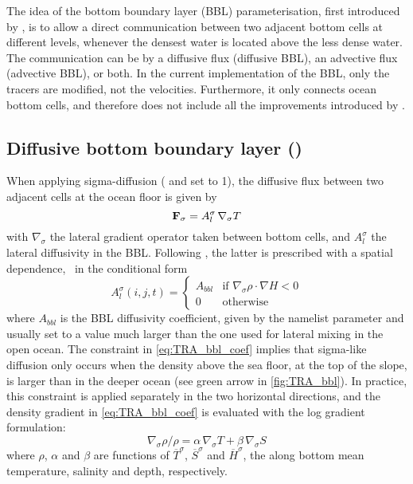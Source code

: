 \documentclass[../main/NEMO_manual]{subfiles}
\begin{document}
The idea of the bottom boundary layer (BBL) parameterisation, first introduced by
\citet{beckmann.doscher_JPO97},
is to allow a direct communication between two adjacent bottom cells at different levels,
whenever the densest water is located above the less dense water.
The communication can be by a diffusive flux (diffusive BBL),
an advective flux (advective BBL), or both.
In the current implementation of the BBL, only the tracers are modified, not the velocities.
Furthermore, it only connects ocean bottom cells,
and therefore does not include all the improvements introduced by \citet{campin.goosse_T99}.

\subsection[Diffusive bottom boundary layer (\forcode{nn_bbl_ldf=1})]{Diffusive bottom boundary layer (\protect{})}
\label{subsec:TRA_bbl_diff}

When applying sigma-diffusion
( and  set to 1),
the diffusive flux between two adjacent cells at the ocean floor is given by
\[
  \mathbf{F}_\sigma = A_l^\sigma \, \nabla_\sigma T
\]
with $\nabla_\sigma$ the lateral gradient operator taken between bottom cells,
and $A_l^\sigma$ the lateral diffusivity in the BBL.
Following \citet{beckmann.doscher_JPO97}, the latter is prescribed with a spatial dependence,
\ie\ in the conditional form
\begin{equation}
  \label{eq:TRA_bbl_coef}
  A_l^\sigma (i,j,t) =
      \begin{cases}
        A_{bbl} & \text{if~} \nabla_\sigma \rho \cdot \nabla H < 0 \\
        0      & \text{otherwise}
      \end{cases}
\end{equation}
where $A_{bbl}$ is the BBL diffusivity coefficient,
given by the namelist parameter  and
usually set to a value much larger than the one used for lateral mixing in the open ocean.
The constraint in \autoref{eq:TRA_bbl_coef} implies that sigma-like diffusion only occurs when
the density above the sea floor, at the top of the slope, is larger than in the deeper ocean
(see green arrow in \autoref{fig:TRA_bbl}).
In practice, this constraint is applied separately in the two horizontal directions,
and the density gradient in \autoref{eq:TRA_bbl_coef} is evaluated with the log gradient formulation:
\[
  \nabla_\sigma \rho / \rho = \alpha \, \nabla_\sigma T + \beta \, \nabla_\sigma S
\]
where $\rho$, $\alpha$ and $\beta$ are functions of
$\overline T^\sigma$, $\overline S^\sigma$ and $\overline H^\sigma$,
the along bottom mean temperature, salinity and depth, respectively.
\end{document}
